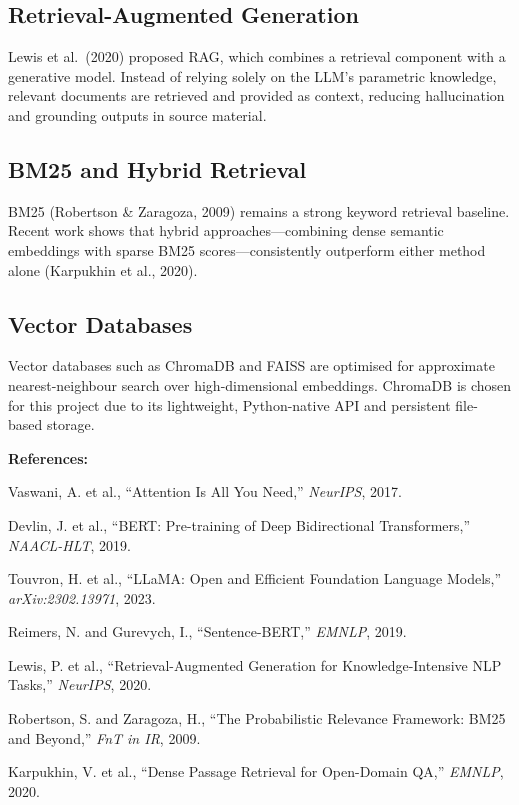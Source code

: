 \documentclass[12pt,a4paper]{article}
\begin{document}
\subsection{Retrieval-Augmented Generation}
Lewis et al.\ (2020) proposed RAG, which combines a retrieval component
with a generative model.  Instead of relying solely on the LLM's parametric
knowledge, relevant documents are retrieved and provided as context,
reducing hallucination and grounding outputs in source material.

\subsection{BM25 and Hybrid Retrieval}
BM25 (Robertson \& Zaragoza, 2009) remains a strong keyword retrieval
baseline.  Recent work shows that hybrid approaches---combining dense
semantic embeddings with sparse BM25 scores---consistently outperform
either method alone (Karpukhin et al., 2020).

\subsection{Vector Databases}
Vector databases such as ChromaDB and FAISS are optimised for approximate
nearest-neighbour search over high-dimensional embeddings.  ChromaDB is
chosen for this project due to its lightweight, Python-native API and
persistent file-based storage.

\vspace{6pt}
\textbf{References:}
\begin{enumerate}[leftmargin=2em, label={[\arabic*]}]
    \item Vaswani, A. et al., ``Attention Is All You Need,''
          \textit{NeurIPS}, 2017.
    \item Devlin, J. et al., ``BERT: Pre-training of Deep Bidirectional
          Transformers,'' \textit{NAACL-HLT}, 2019.
    \item Touvron, H. et al., ``LLaMA: Open and Efficient Foundation
          Language Models,'' \textit{arXiv:2302.13971}, 2023.
    \item Reimers, N. and Gurevych, I., ``Sentence-BERT,''
          \textit{EMNLP}, 2019.
    \item Lewis, P. et al., ``Retrieval-Augmented Generation for
          Knowledge-Intensive NLP Tasks,'' \textit{NeurIPS}, 2020.
    \item Robertson, S. and Zaragoza, H., ``The Probabilistic Relevance
          Framework: BM25 and Beyond,'' \textit{FnT in IR}, 2009.
    \item Karpukhin, V. et al., ``Dense Passage Retrieval for Open-Domain
          QA,'' \textit{EMNLP}, 2020.
\end{enumerate}
\end{document}
